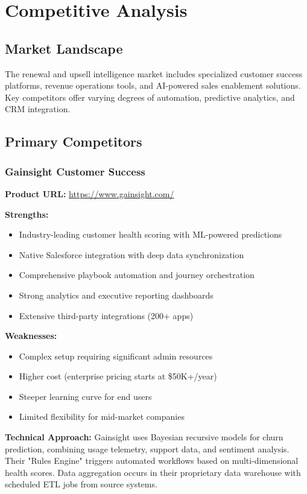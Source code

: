 \documentclass[12pt,a4paper]{article}
\begin{document}
\section{Competitive Analysis}

\subsection{Market Landscape}
The renewal and upsell intelligence market includes specialized customer success platforms, revenue operations tools, and AI-powered sales enablement solutions. Key competitors offer varying degrees of automation, predictive analytics, and CRM integration.

\subsection{Primary Competitors}
\subsubsection{Gainsight Customer Success}
\textbf{Product URL:} \url{https://www.gainsight.com/}

\textbf{Strengths:}
\begin{itemize}
    \item Industry-leading customer health scoring with ML-powered predictions
    \item Native Salesforce integration with deep data synchronization
    \item Comprehensive playbook automation and journey orchestration
    \item Strong analytics and executive reporting dashboards
    \item Extensive third-party integrations (200+ apps)
\end{itemize}

\textbf{Weaknesses:}
\begin{itemize}
    \item Complex setup requiring significant admin resources
    \item Higher cost (enterprise pricing starts at \$50K+/year)
    \item Steeper learning curve for end users
    \item Limited flexibility for mid-market companies
\end{itemize}

\textbf{Technical Approach:} Gainsight uses Bayesian recursive models for churn prediction, combining usage telemetry, support data, and sentiment analysis. Their "Rules Engine" triggers automated workflows based on multi-dimensional health scores. Data aggregation occurs in their proprietary data warehouse with scheduled ETL jobs from source systems.
\end{document}
